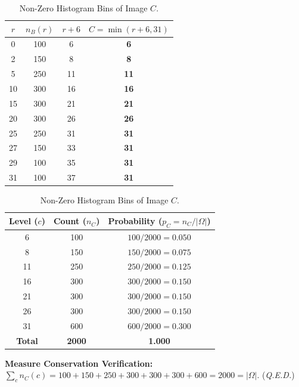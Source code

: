 \documentclass[11pt,a4paper]{article}
\begin{document}
\begin{table}[htbp]
\centering
\small
\begin{minipage}[t]{0.48\textwidth}
\centering
\caption{Pointwise Saturated Addition Mapping.}
\label{tab:p1_mapping}
\begin{tabular}{cccc}
\toprule
\textbf{$r$} & \textbf{$n_B(r)$} & \textbf{$r + 6$} & \textbf{$C = \min(r+6, 31)$} \\
\midrule
0  & 100 & 6  & \textbf{6}  \\
2  & 150 & 8  & \textbf{8}  \\
5  & 250 & 11 & \textbf{11} \\
10 & 300 & 16 & \textbf{16} \\
15 & 300 & 21 & \textbf{21} \\
20 & 300 & 26 & \textbf{26} \\
25 & 250 & 31 & \textbf{31} \\
27 & 150 & 33 & \textbf{31} \\
29 & 100 & 35 & \textbf{31} \\
31 & 100 & 37 & \textbf{31} \\
\bottomrule
\end{tabular}
\end{minipage}\hfill
\begin{minipage}[t]{0.48\textwidth}
\centering
\caption{Non-Zero Histogram Bins of Image $C$.}
\label{tab:p1_hist_C}
\begin{tabular}{ccc}
\toprule
\textbf{Level ($c$)} & \textbf{Count ($n_C$)} & \textbf{Probability ($p_C = n_C/|\Omega|$)} \\
\midrule
6  & 100 & $100 / 2000 = 0.050$ \\
8  & 150 & $150 / 2000 = 0.075$ \\
11 & 250 & $250 / 2000 = 0.125$ \\
16 & 300 & $300 / 2000 = 0.150$ \\
21 & 300 & $300 / 2000 = 0.150$ \\
26 & 300 & $300 / 2000 = 0.150$ \\
31 & 600 & $600 / 2000 = 0.300$ \\
\midrule
\textbf{Total} & \textbf{2000} & \textbf{1.000} \\
\bottomrule
\end{tabular}
\end{minipage}
\end{table}

\noindent\textbf{Measure Conservation Verification:}
$\sum_{c} n_C(c) = 100 + 150 + 250 + 300 + 300 + 300 + 600 = 2000 = |\Omega|$. \quad (\textit{Q.E.D.})
\end{document}
